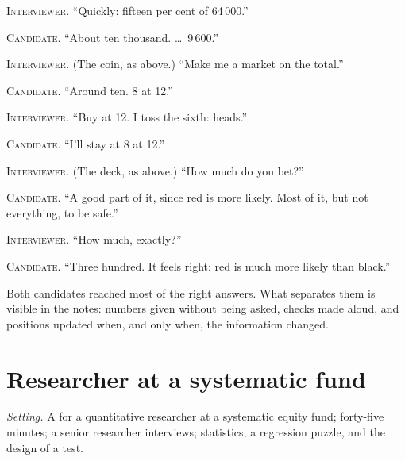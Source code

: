 \noindent\textsc{Interviewer.} ``Quickly: fifteen per cent of 64\,000.''

\noindent\textsc{Candidate.} ``About ten thousand. \ldots\ 9\,600.''


\noindent\textsc{Interviewer.} (The coin, as above.) ``Make me a market on the total.''

\noindent\textsc{Candidate.} ``Around ten. 8 at 12.''


\noindent\textsc{Interviewer.} ``Buy at 12. I toss the sixth: heads.''

\noindent\textsc{Candidate.} ``I'll stay at 8 at 12.''


\noindent\textsc{Interviewer.} (The deck, as above.) ``How much do you bet?''

\noindent\textsc{Candidate.} ``A good part of it, since red is more likely. Most of it, but not everything, to be safe.''


\noindent\textsc{Interviewer.} ``How much, exactly?''

\noindent\textsc{Candidate.} ``Three hundred. It feels right: red is much more likely than black.''


Both candidates reached most of the right answers. What separates them is visible in the notes: numbers given without being asked,
checks made aloud, and positions updated when, and only when, the information changed.

\section{Researcher at a systematic fund}

\emph{Setting.} A  for a quantitative researcher at a systematic equity fund; forty-five minutes; a senior
researcher interviews; statistics, a regression puzzle, and the design of a test.

